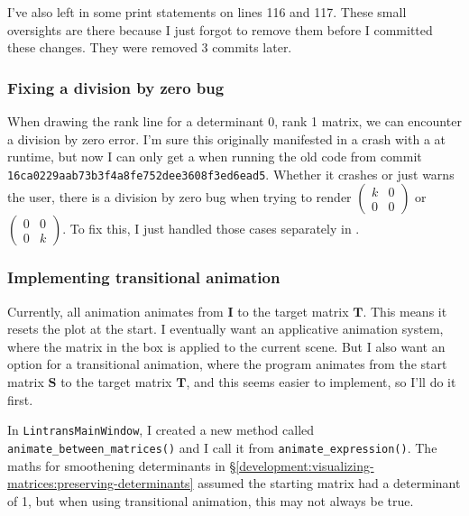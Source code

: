 \documentclass[../development.tex]{subfiles}
\begin{document}
I've also left in some print statements on lines 116 and 117. These small oversights are there because I just forgot to remove them before I committed these changes. They were removed 3 commits later.

\subsubsection{Fixing a division by zero bug\label{development:improving-the-gui:fixing-a-division-by-zero-bug}}

When drawing the rank line for a determinant 0, rank 1 matrix, we can encounter a division by zero error. I'm sure this originally manifested in a crash with a  at runtime, but now I can only get a  when running the old code from commit \texttt{16ca0229aab73b3f4a8fe752dee3608f3ed6ead5}. Whether it crashes or just warns the user, there is a division by zero bug when trying to render $\begin{pmatrix}k & 0\\ 0 & 0\end{pmatrix}$ or $\begin{pmatrix}0 & 0\\ 0 & k\end{pmatrix}$. To fix this, I just handled those cases separately in .


\subsubsection{Implementing transitional animation\label{development:improving-the-gui:implementing-transitional-animation}}

Currently, all animation animates from $\mathbf{I}$ to the target matrix $\mathbf{T}$. This means it resets the plot at the start. I eventually want an applicative animation system, where the matrix in the box is applied to the current scene. But I also want an option for a transitional animation, where the program animates from the start matrix $\mathbf{S}$ to the target matrix $\mathbf{T}$, and this seems easier to implement, so I'll do it first.

In \texttt{LintransMainWindow}, I created a new method called \texttt{animate_between_matrices()} and I call it from \texttt{animate_expression()}. The maths for smoothening determinants in \S\ref{development:visualizing-matrices:preserving-determinants} assumed the starting matrix had a determinant of 1, but when using transitional animation, this may not always be true.
\end{document}
